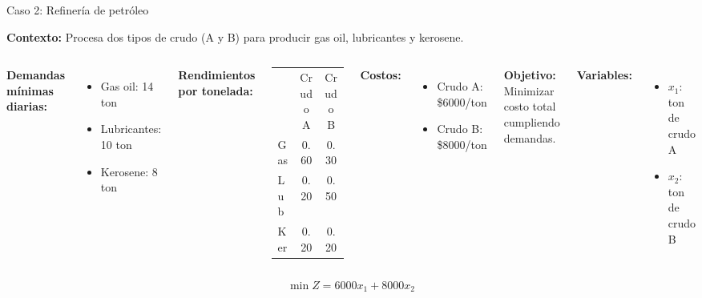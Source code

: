 \documentclass[aspectratio=169,10pt]{beamer}
\begin{document}
\begin{frame}{Caso 2: Refinería de petróleo}

\textbf{Contexto:} Procesa dos tipos de crudo (A y B) para producir gas oil, lubricantes y kerosene.

\vspace{0.3cm}

\begin{columns}[T]
\textbf{Demandas mínimas diarias:}
\begin{itemize}
    \item Gas oil: 14 ton
    \item Lubricantes: 10 ton
    \item Kerosene: 8 ton
\end{itemize}

\vspace{0.3cm}

\textbf{Rendimientos por tonelada:}
\begin{tabular}{lcc}
& Crudo A & Crudo B \\
Gas & 0.60 & 0.30 \\
Lub & 0.20 & 0.50 \\
Ker & 0.20 & 0.20 \\
\end{tabular}

\textbf{Costos:}
\begin{itemize}
    \item Crudo A: \$6000/ton
    \item Crudo B: \$8000/ton
\end{itemize}

\vspace{0.3cm}

\textbf{Objetivo:}
Minimizar costo total cumpliendo demandas.

\vspace{0.3cm}

\textbf{Variables:}
\begin{itemize}
    \item $x_1$: ton de crudo A
    \item $x_2$: ton de crudo B
\end{itemize}
\end{columns}

\vspace{0.3cm}

\begin{center}
$$\min Z = 6000x_1 + 8000x_2$$
\end{center}

\end{frame}
\end{document}
